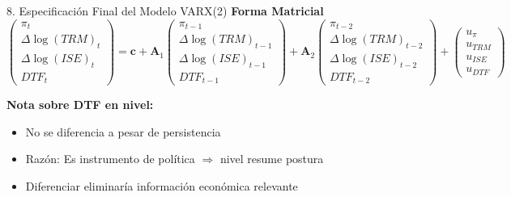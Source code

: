 \documentclass[spanish, 11pt]{beamer}
\begin{document}
\begin{frame}{8. Especificación Final del Modelo VARX(2)}
\textbf{Forma Matricial}
\[
\begin{pmatrix} \pi_t \\ \Delta \log(TRM)_t \\ \Delta \log(ISE)_t \\ DTF_t \end{pmatrix} = \mathbf{c} + \mathbf{A}_1 \begin{pmatrix} \pi_{t-1} \\ \Delta \log(TRM)_{t-1} \\ \Delta \log(ISE)_{t-1} \\ DTF_{t-1} \end{pmatrix} + \mathbf{A}_2 \begin{pmatrix} \pi_{t-2} \\ \Delta \log(TRM)_{t-2} \\ \Delta \log(ISE)_{t-2} \\ DTF_{t-2} \end{pmatrix} + \begin{pmatrix} u_\pi \\ u_{TRM} \\ u_{ISE} \\ u_{DTF} \end{pmatrix}
\]

\vspace{0.2cm}
\textbf{Nota sobre DTF en nivel:}
\begin{itemize}
  \item No se diferencia a pesar de persistencia
  \item Razón: Es instrumento de política $\Rightarrow$ nivel resume postura
  \item Diferenciar eliminaría información económica relevante
\end{itemize}
\end{frame}
\end{document}
